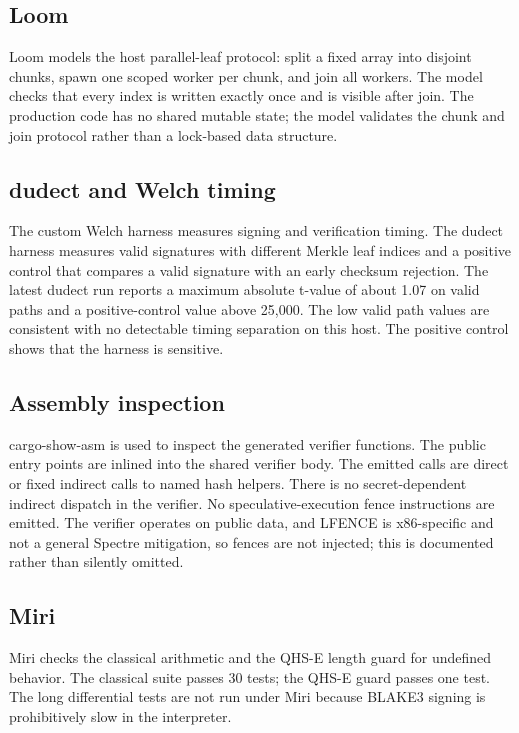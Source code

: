\documentclass[11pt,a4paper]{article}
\begin{document}
\subsection{Loom}

Loom models the host parallel-leaf protocol: split a fixed array into disjoint
chunks, spawn one scoped worker per chunk, and join all workers. The model
checks that every index is written exactly once and is visible after join. The
production code has no shared mutable state; the model validates the chunk and
join protocol rather than a lock-based data structure.

\subsection{dudect and Welch timing}

The custom Welch harness measures signing and verification timing. The dudect
harness measures valid signatures with different Merkle leaf indices and a
positive control that compares a valid signature with an early checksum
rejection. The latest dudect run reports a maximum absolute t-value of about
1.07 on valid paths and a positive-control value above 25,000. The low valid
path values are consistent with no detectable timing separation on this host.
The positive control shows that the harness is sensitive.

\subsection{Assembly inspection}

cargo-show-asm is used to inspect the generated verifier functions. The
public entry points are inlined into the shared verifier body. The emitted
calls are direct or fixed indirect calls to named hash helpers. There is no
secret-dependent indirect dispatch in the verifier. No speculative-execution
fence instructions are emitted. The verifier operates on public data, and
LFENCE is x86-specific and not a general Spectre mitigation, so fences are not
injected; this is documented rather than silently omitted.

\subsection{Miri}

Miri checks the classical arithmetic and the QHS-E length guard for undefined
behavior. The classical suite passes 30 tests; the QHS-E guard passes one test.
The long differential tests are not run under Miri because BLAKE3 signing is
prohibitively slow in the interpreter.
\end{document}
